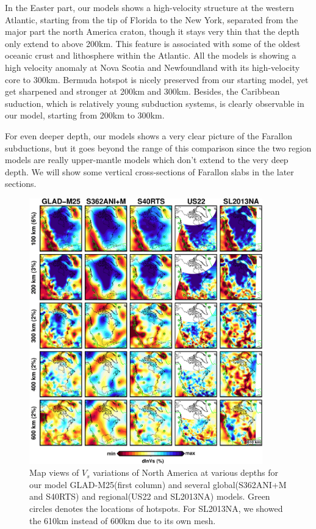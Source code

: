\documentclass[extra,mreferee]{gji}
\begin{document}
In the Easter part, our models shows a high-velocity structure at the western
Atlantic, starting from the tip of Florida to the New York,
separated from the major part the north America craton,
though it stays very thin that the depth only extend to above 200km.
This feature is associated with some of the oldest oceanic crust and lithosphere
within the Atlantic\citep{muller2008, schaeffer2014imaging}.
All the models is showing a high velocity anomaly at Nova Scotia and Newfoundland
with its high-velocity core to 300km.
Bermuda hotspot is nicely preserved from our starting
model, yet get sharpened and stronger at 200km and 300km. Besides, the
Caribbean suduction, which is relatively young subduction systems, is clearly
observable in our model, starting from 200km to 300km.

For even deeper depth, our models shows a very clear picture of the Farallon
subductions, but it goes beyond the range of this comparison since the two
region models are really upper-mantle models which don't extend to the very
deep depth. We will show some vertical cross-sections of Farallon slabs in
the later sections.

\begin{figure}
\centering
\includegraphics[width=0.9\textwidth]{figures/depth_slice/america_vs.pdf}
  \caption{Map views of $V_s$ variations of North America at various depths
  for our model GLAD-M25(first column) and several global(S362ANI+M and S40RTS)
  and regional(US22\citep{zhu2017radial} and SL2013NA\citep{schaeffer2014imaging})
  models. Green circles denotes the locations of hotspots. For SL2013NA, we
  showed the 610km instead of 600km due to its own mesh.}
\label{fig:america-vs}

\end{figure}
\end{document}
